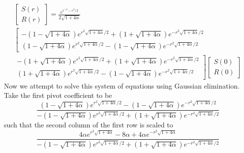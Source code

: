 \documentclass{article}
\begin{document}
\begin{multline*}
\begin{bmatrix}
S(r)\\
R(r)
\end{bmatrix}
= \frac{e^{r^{-2}-r^{2}/2}}{ 2\sqrt{1 + 4\alpha} }\\
\left[
\begin{matrix}
-\left( 1 - \sqrt{1 + 4\alpha} \right)e^{r^{2}\sqrt{1 + 4\alpha}/2} +\left( 1 + \sqrt{1 + 4\alpha} \right)e^{-r^{2}\sqrt{1 + 4\alpha}/2}	\\
\left( 1 - \sqrt{1 + 4\alpha} \right)e^{r^{2}\sqrt{1 + 4\alpha}/2} -\left( 1 - \sqrt{1 + 4\alpha} \right)e^{-r^{2}\sqrt{1 + 4\alpha}/2}	
\end{matrix}
\right.
\\
\left.
\begin{matrix}
-\left( 1 + \sqrt{1 + 4\alpha} \right)e^{r^{2}\sqrt{1 + 4\alpha}/2} +\left( 1 + \sqrt{1 + 4\alpha} \right)e^{-r^{2}\sqrt{1 + 4\alpha}/2}	\\
\left( 1 + \sqrt{1 + 4\alpha} \right)e^{r^{2}\sqrt{1 + 4\alpha}/2} -\left( 1 - \sqrt{1 + 4\alpha} \right)e^{-r^{2}\sqrt{1 + 4\alpha}/2}	
\end{matrix}
\right]
\begin{bmatrix}
S(0)\\
R(0)
\end{bmatrix}
\end{multline*}
Now we attempt to solve this system of equations using Gaussian elimination. Take the first pivot coefficient to be
\[
\frac{\left( 1 - \sqrt{1 + 4\alpha} \right)e^{r^{2}\sqrt{1 + 4\alpha}/2} -\left( 1 - \sqrt{1 + 4\alpha} \right)e^{-r^{2}\sqrt{1 + 4\alpha}/2}}{-\left( 1 - \sqrt{1 + 4\alpha} \right)e^{r^{2}\sqrt{1 + 4\alpha}/2} +\left( 1 + \sqrt{1 + 4\alpha} \right)e^{-r^{2}\sqrt{1 + 4\alpha}/2}}
\]
such that the second column of the first row is scaled to
\[
\frac{ 4\alpha e^{r^{2}\sqrt{1+4\alpha}} -8\alpha +4\alpha e^{-r^{2}\sqrt{1+4\alpha}} }{ -\left( 1 - \sqrt{1 + 4\alpha} \right)e^{r^{2}\sqrt{1 + 4\alpha}/2} +\left( 1 + \sqrt{1 + 4\alpha} \right)e^{-r^{2}\sqrt{1 + 4\alpha}/2} }
\]
\end{document}
